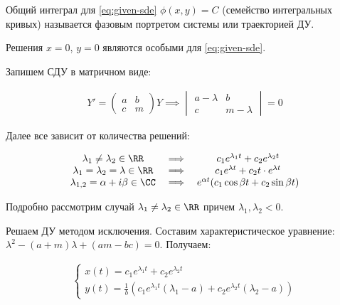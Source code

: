 \begin{multicols}{2}
  
  \columnbreak

  \begin{definition}
    Общий интеграл для \ref{eq:given-sde} \(\phi(x, y) = C\) (семейство
    интегральных кривых) называется фазовым портретом системы или траекторией
    ДУ.
  \end{definition}

  \begin{remark}
    Решения \(x = 0\), \(y = 0\) являются особыми для \ref{eq:given-sde}.
  \end{remark}
\end{multicols}

Запишем СДУ в матричном виде:

\begin{align*}
  Y' = \begin{pmatrix}
    a & b \\
    c & m
  \end{pmatrix} Y
  \implies \begin{vmatrix}
    a - \lambda & b \\
    c & m - \lambda
  \end{vmatrix} = 0
\end{align*}

Далее все зависит от количества решений:

\begin{align*}
  \begin{matrix}
    \lambda_{1} \neq \lambda_{2} \in \RR
      & \implies & c_{1} e^{\lambda_{1} t} + c_{2} e^{\lambda_{2} t}
    \\
    \lambda_{1} = \lambda_{2} = \lambda \in \RR
      & \implies & c_{1} e^{\lambda t} + c_{2} t \cdot e^{\lambda t}
    \\
    \lambda_{1, 2} = \alpha + i \beta \in \CC
      & \implies & e^{\alpha t} (c_{1} \cos \beta t + c_{2} \sin \beta t)
  \end{matrix}
\end{align*}

Подробно рассмотрим случай \(\lambda_{1} \neq \lambda_{2} \in \RR\) причем
\(\lambda_{1}, \lambda_{2} < 0\).

Решаем ДУ методом исключения. Составим характеристическое уравнение:
\(\lambda^2 - (a + m) \lambda + (a m - b c) = 0\). Получаем:

\begin{align*}\label{sde-generic}
  \begin{cases}
    x(t) = c_{1} e^{\lambda_{1} t} + c_{2} e^{\lambda_{2} t} \\
    y(t) = \frac{1}{b} \left(
      c_{1} e^{\lambda_{1} t} (\lambda_{1} - a)
        + c_{2} e^{\lambda_{2} t} (\lambda_{2} - a)
    \right)
  \end{cases}
\end{align*}

